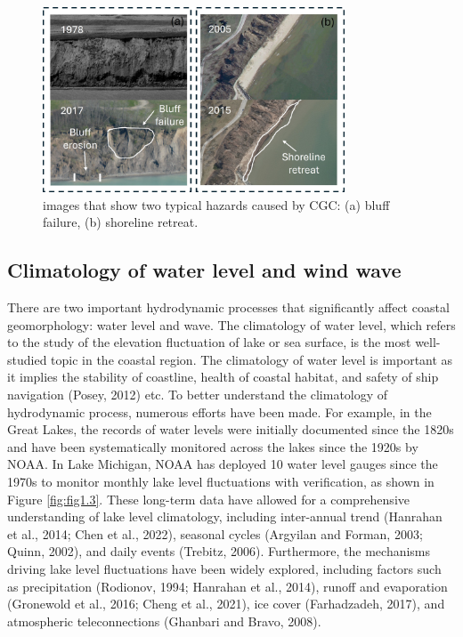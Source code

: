 \begin{figure}[htbp]
  \centering
  \includegraphics[width=0.8\textwidth]{chapter1/resources/figure1-2.jpg}
  \caption{images that show two typical hazards caused by CGC: (a) bluff failure, (b) shoreline retreat.}
  \label{fig:fig1.2}
\end{figure}


\subsection{Climatology of water level and wind wave}
\label{subsec:Climatology of water level and wind wave}

There are two important hydrodynamic processes that significantly affect coastal geomorphology: water level and wave. The climatology of water level, which refers to the study of the elevation fluctuation of lake or sea surface, is the most well-studied topic in the coastal region. The climatology of water level is important as it implies the stability of coastline, health of coastal habitat, and safety of ship navigation (Posey, 2012) etc. To better understand the climatology of hydrodynamic process, numerous efforts have been made. For example, in the Great Lakes, the records of water levels were initially documented since the 1820s and have been systematically monitored across the lakes since the 1920s by NOAA. In Lake Michigan, NOAA has deployed 10 water level gauges since the 1970s to monitor monthly lake level fluctuations with verification, as shown in Figure \ref{fig:fig1.3}. These long-term data have allowed for a comprehensive understanding of lake level climatology, including inter-annual trend (Hanrahan et al., 2014; Chen et al., 2022), seasonal cycles (Argyilan and Forman, 2003; Quinn, 2002), and daily events (Trebitz, 2006). Furthermore, the mechanisms driving lake level fluctuations have been widely explored, including factors such as precipitation (Rodionov, 1994; Hanrahan et al., 2014), runoff and evaporation (Gronewold et al., 2016; Cheng et al., 2021), ice cover (Farhadzadeh, 2017), and atmospheric teleconnections (Ghanbari and Bravo, 2008).

